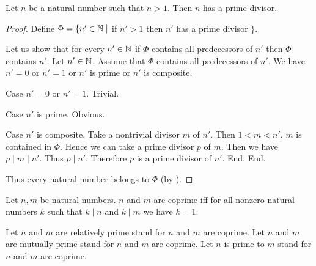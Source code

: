 \documentclass[10pt]{article}
\begin{document}
  \begin{forthel}
    \begin{proposition}[id=ARITHMETIC_10_3606185106210816,printid]
      Let $n$ be a natural number such that $n > 1$.
      Then $n$ has a prime divisor.
    \end{proposition}
    \begin{proof}
      Define $\Phi = \{ n' \in \mathbb{N} \mid$ if $n' > 1$ then $n'$ has a prime divisor $\}$.

      Let us show that for every $n' \in \mathbb{N}$ if $\Phi$ contains all
      predecessors of $n'$ then $\Phi$ contains $n'$.
        Let $n' \in \mathbb{N}$.
        Assume that $\Phi$ contains all predecessors of $n'$.
        We have $n' = 0$ or $n' = 1$ or $n'$ is prime or $n'$ is composite.

        Case $n' = 0$ or $n' = 1$. Trivial.

        Case $n'$ is prime. Obvious.

        Case $n'$ is composite.
          Take a nontrivial divisor $m$ of $n'$.
          Then $1 < m < n'$.
          $m$ is contained in $\Phi$.
          Hence we can take a prime divisor $p$ of $m$.
          Then we have $p \mid m \mid n'$.
          Thus $p \mid n'$.
          Therefore $p$ is a prime divisor of $n'$.
        End.
      End.

      Thus every natural number belongs to $\Phi$ (by ).
    \end{proof}
  \end{forthel}

  \begin{forthel}
    \begin{definition}[id=ARITHMETIC_10_463197419077632,printid]
      Let $n, m$ be natural numbers.
      $n$ and $m$ are coprime iff for all nonzero natural numbers $k$ such that $k \mid n$ and $k \mid m$ we have $k = 1$.
    \end{definition}

    Let $n$ and $m$ are relatively prime stand for $n$ and $m$ are coprime.
    Let $n$ and $m$ are mutually prime stand for $n$ and $m$ are coprime.
    Let $n$ is prime to $m$ stand for $n$ and $m$ are coprime.
  \end{forthel}
\end{document}
